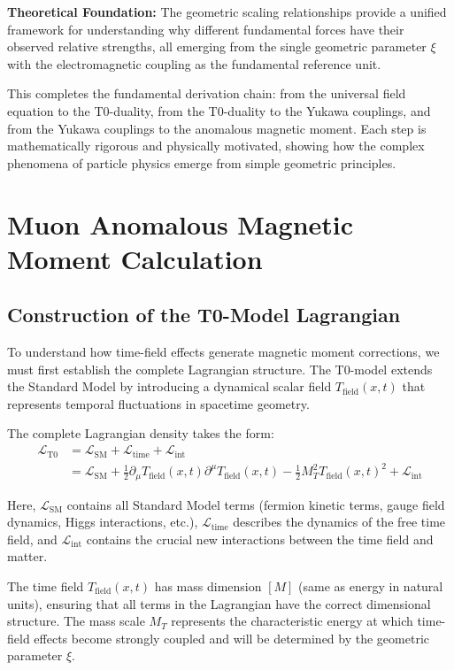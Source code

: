 \documentclass[12pt,a4paper]{article}
\newcommand{\Tfield}{T_{\text{field}}(x,t)}
\newcommand{\xigeom}{\xi}
\begin{document}
\textbf{Theoretical Foundation:} The geometric scaling relationships provide a unified framework for understanding why different fundamental forces have their observed relative strengths, all emerging from the single geometric parameter $\xigeom$ with the electromagnetic coupling as the fundamental reference unit.

This completes the fundamental derivation chain: from the universal field equation to the T0-duality, from the T0-duality to the Yukawa couplings, and from the Yukawa couplings to the anomalous magnetic moment. Each step is mathematically rigorous and physically motivated, showing how the complex phenomena of particle physics emerge from simple geometric principles.
	\section{Muon Anomalous Magnetic Moment Calculation}
	
	\subsection{Construction of the T0-Model Lagrangian}
	
	To understand how time-field effects generate magnetic moment corrections, we must first establish the complete Lagrangian structure. The T0-model extends the Standard Model by introducing a dynamical scalar field $\Tfield$ that represents temporal fluctuations in spacetime geometry.
	
	The complete Lagrangian density takes the form:
	\begin{align}
		\mathcal{L}_{\text{T0}} &= \mathcal{L}_{\text{SM}} + \mathcal{L}_{\text{time}} + \mathcal{L}_{\text{int}} \\
		&= \mathcal{L}_{\text{SM}} + \frac{1}{2}\partial_\mu \Tfield \partial^\mu \Tfield - \frac{1}{2}M_T^2 \Tfield^2 + \mathcal{L}_{\text{int}}
	\end{align}
	
	Here, $\mathcal{L}_{\text{SM}}$ contains all Standard Model terms (fermion kinetic terms, gauge field dynamics, Higgs interactions, etc.), $\mathcal{L}_{\text{time}}$ describes the dynamics of the free time field, and $\mathcal{L}_{\text{int}}$ contains the crucial new interactions between the time field and matter.
	
	The time field $\Tfield$ has mass dimension $[M]$ (same as energy in natural units), ensuring that all terms in the Lagrangian have the correct dimensional structure. The mass scale $M_T$ represents the characteristic energy at which time-field effects become strongly coupled and will be determined by the geometric parameter $\xigeom$.
	
\end{document}
